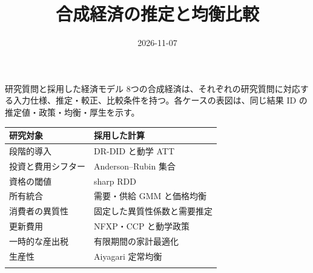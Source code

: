 \documentclass[unicode, mathserif, m, 10pt, unknownkeysallowed,japanese,aspectratio=169]{beamer}
\title{合成経済の推定と均衡比較}
\author{}
\date{2026-11-07}
\newcounter{none} %
\begin{document}
\begin{frame}[plain,b]
 \titlepage
\end{frame}

\begin{frame}{研究質問と採用した経済モデル}
\protect{}\label{question}
8つの合成経済は、それぞれの研究質問に対応する入力仕様、推定・較正、比較条件を持つ。各ケースの表図は、同じ結果
ID の推定値・政策・均衡・厚生を示す。

{\def\LTcaptype{none} %
\begin{longtable}[]{@{}ll@{}}
\toprule\noalign{}
研究対象 & 採用した計算 \\
\midrule\noalign{}
\endhead
段階的導入 & DR-DID と動学 ATT \\
投資と費用シフター & Anderson--Rubin 集合 \\
資格の閾値 & sharp RDD \\
所有統合 & 需要・供給 GMM と価格均衡 \\
消費者の異質性 & 固定した異質性係数と需要推定 \\
更新費用 & NFXP・CCP と動学政策 \\
一時的な産出税 & 有限期間の家計最適化 \\
生産性 & Aiyagari 定常均衡 \\
\bottomrule\noalign{}
\end{longtable}
}
\end{frame}
\end{document}
